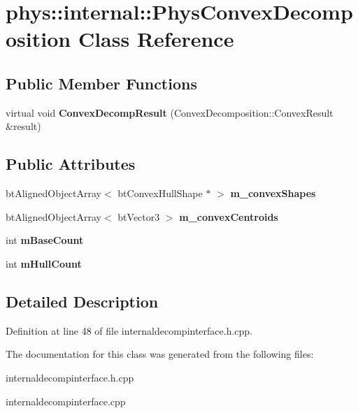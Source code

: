 \hypertarget{classphys_1_1internal_1_1PhysConvexDecomposition}{
\section{phys::internal::PhysConvexDecomposition Class Reference}
\label{d8/d61/classphys_1_1internal_1_1PhysConvexDecomposition}
}
\subsection*{Public Member Functions}
\begin{DoxyCompactItemize}
\item 
\hypertarget{classphys_1_1internal_1_1PhysConvexDecomposition_a91a53dc1f173f8faed44297174e7a475}{
virtual void {\bfseries ConvexDecompResult} (ConvexDecomposition::ConvexResult \&result)}
\label{d8/d61/classphys_1_1internal_1_1PhysConvexDecomposition_a91a53dc1f173f8faed44297174e7a475}

\end{DoxyCompactItemize}
\subsection*{Public Attributes}
\begin{DoxyCompactItemize}
\item 
\hypertarget{classphys_1_1internal_1_1PhysConvexDecomposition_a1ddf4234b3b8f860b51b12de54eaa70a}{
btAlignedObjectArray$<$ btConvexHullShape $\ast$ $>$ {\bfseries m\_\-convexShapes}}
\label{d8/d61/classphys_1_1internal_1_1PhysConvexDecomposition_a1ddf4234b3b8f860b51b12de54eaa70a}

\item 
\hypertarget{classphys_1_1internal_1_1PhysConvexDecomposition_ac19bdd8a69b78219c5f3e6938d46b5b6}{
btAlignedObjectArray$<$ btVector3 $>$ {\bfseries m\_\-convexCentroids}}
\label{d8/d61/classphys_1_1internal_1_1PhysConvexDecomposition_ac19bdd8a69b78219c5f3e6938d46b5b6}

\item 
\hypertarget{classphys_1_1internal_1_1PhysConvexDecomposition_acae01f0f9250dfb25f67a32f18134017}{
int {\bfseries mBaseCount}}
\label{d8/d61/classphys_1_1internal_1_1PhysConvexDecomposition_acae01f0f9250dfb25f67a32f18134017}

\item 
\hypertarget{classphys_1_1internal_1_1PhysConvexDecomposition_abfec95975da66bfddb8a93cd5f05182a}{
int {\bfseries mHullCount}}
\label{d8/d61/classphys_1_1internal_1_1PhysConvexDecomposition_abfec95975da66bfddb8a93cd5f05182a}

\end{DoxyCompactItemize}


\subsection{Detailed Description}


Definition at line 48 of file internaldecompinterface.h.cpp.



The documentation for this class was generated from the following files:\begin{DoxyCompactItemize}
\item 
internaldecompinterface.h.cpp\item 
internaldecompinterface.cpp\end{DoxyCompactItemize}
